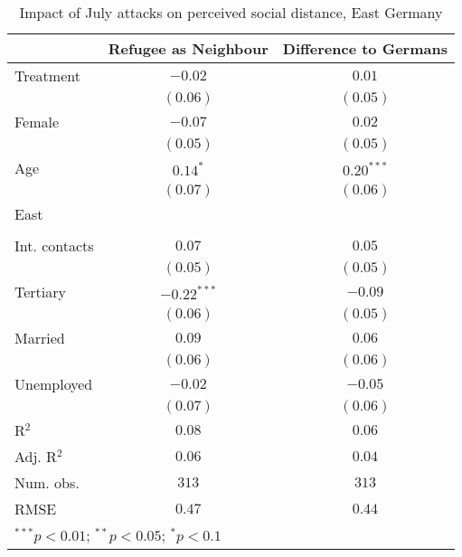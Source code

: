 
\begin{table}
\caption{Impact of July attacks on perceived social distance, East Germany}
\begin{center}
\begin{tabular}{l c c}
\toprule
 & Refugee as Neighbour & Difference to Germans \\
\midrule
Treatment     & $-0.02$       & $0.01$       \\
              & $(0.06)$      & $(0.05)$     \\
Female        & $-0.07$       & $0.02$       \\
              & $(0.05)$      & $(0.05)$     \\
Age           & $0.14^{*}$    & $0.20^{***}$ \\
              & $(0.07)$      & $(0.06)$     \\
East          &               &              \\
              &               &              \\
Int. contacts & $0.07$        & $0.05$       \\
              & $(0.05)$      & $(0.05)$     \\
Tertiary      & $-0.22^{***}$ & $-0.09$      \\
              & $(0.06)$      & $(0.05)$     \\
Married       & $0.09$        & $0.06$       \\
              & $(0.06)$      & $(0.06)$     \\
Unemployed    & $-0.02$       & $-0.05$      \\
              & $(0.07)$      & $(0.06)$     \\
\midrule
R$^2$         & $0.08$        & $0.06$       \\
Adj. R$^2$    & $0.06$        & $0.04$       \\
Num. obs.     & $313$         & $313$        \\
RMSE          & $0.47$        & $0.44$       \\
\bottomrule
\multicolumn{3}{l}{\scriptsize{$^{***}p<0.01$; $^{**}p<0.05$; $^{*}p<0.1$}}
\end{tabular}
\label{tab_dist_east}
\end{center}
\end{table}
